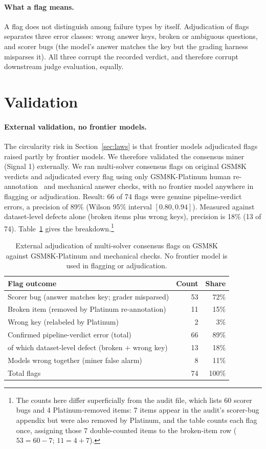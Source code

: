 \documentclass[11pt]{article}
\begin{document}
\paragraph{What a flag means.}
A flag does not distinguish among failure types by itself.
Adjudication of flags separates three error classes: wrong answer keys, broken or ambiguous questions, and scorer bugs (the model's answer matches the key but the grading harness misparses it).
All three corrupt the recorded verdict, and therefore corrupt downstream judge evaluation, equally.

\section{Validation}
\label{sec:validation}

\paragraph{External validation, no frontier models.}
The circularity risk in Section~\ref{sec:laws} is that frontier models adjudicated flags raised partly by frontier models.
We therefore validated the consensus miner (Signal 1) externally.
We ran multi-solver consensus flags on original GSM8K verdicts and adjudicated every flag using only GSM8K-Platinum human re-annotation~\cite{platinum} and mechanical answer checks, with no frontier model anywhere in flagging or adjudication.
Result: 66 of 74 flags were genuine pipeline-verdict errors, a precision of 89\% (Wilson 95\% interval $[0.80, 0.94]$).
Measured against dataset-level defects alone (broken items plus wrong keys), precision is 18\% (13 of 74).
Table~\ref{tab:validation} gives the breakdown.\footnote{The counts here differ superficially from the audit file, which lists 60 scorer bugs and 4 Platinum-removed items: 7 items appear in the audit's scorer-bug appendix but were also removed by Platinum, and the table counts each flag once, assigning those 7 double-counted items to the broken-item row ($53 = 60 - 7$; $11 = 4 + 7$).}

\begin{table}[t]
\centering
\begin{tabular}{@{}lrr@{}}
\toprule
Flag outcome & Count & Share \\
\midrule
Scorer bug (answer matches key; grader misparsed) & 53 & 72\% \\
Broken item (removed by Platinum re-annotation) & 11 & 15\% \\
Wrong key (relabeled by Platinum) & 2 & 3\% \\
\midrule
Confirmed pipeline-verdict error (total) & 66 & 89\% \\
\quad of which dataset-level defect (broken $+$ wrong key) & 13 & 18\% \\
Models wrong together (miner false alarm) & 8 & 11\% \\
\midrule
Total flags & 74 & 100\% \\
\bottomrule
\end{tabular}
\caption{External adjudication of multi-solver consensus flags on GSM8K against GSM8K-Platinum and mechanical checks. No frontier model is used in flagging or adjudication.}
\label{tab:validation}
\end{table}
\end{document}
